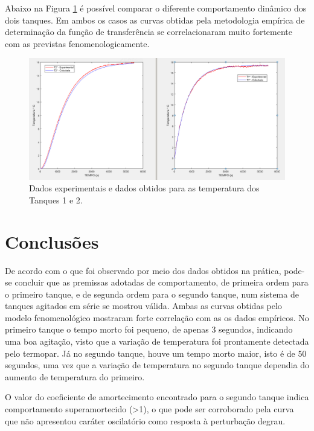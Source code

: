 Abaixo na Figura \ref{dois} é possível comparar o diferente comportamento dinâmico dos dois tanques. Em ambos os casos as curvas obtidas pela  metodologia empírica de determinação da função de transferência se correlacionaram muito fortemente com as previstas fenomenologicamente.




\begin{figure}[H]
	\begin{center}
		\includegraphics[scale=.5, trim={0 0 0 0}]{figuras/ladeq/dina/graph3}
		\caption{Dados experimentais e dados obtidos para as temperatura dos Tanques 1 e 2.}
		\label{dois}
	\end{center}
\end{figure}


\chapter{ Conclusões}

De acordo com o que foi observado por meio dos dados obtidos na prática, pode-se concluir que as premissas adotadas de comportamento, de primeira ordem para o primeiro tanque, e de segunda ordem para o segundo tanque, num sistema de tanques agitados em série se mostrou válida. Ambas as curvas obtidas pelo modelo fenomenológico mostraram forte correlação com as os dados empíricos. No primeiro tanque o tempo morto foi pequeno, de apenas 3 segundos, indicando uma boa agitação, visto que a variação de temperatura foi prontamente detectada pelo termopar. Já no segundo tanque, houve um tempo morto maior, isto é de 50 segundos, uma vez que a variação de temperatura no segundo tanque dependia do aumento de temperatura do primeiro. 

O valor do coeficiente de amortecimento encontrado para o segundo tanque indica comportamento superamortecido (>1), o que pode ser corroborado pela curva que não apresentou caráter oscilatório como resposta à perturbação degrau.












